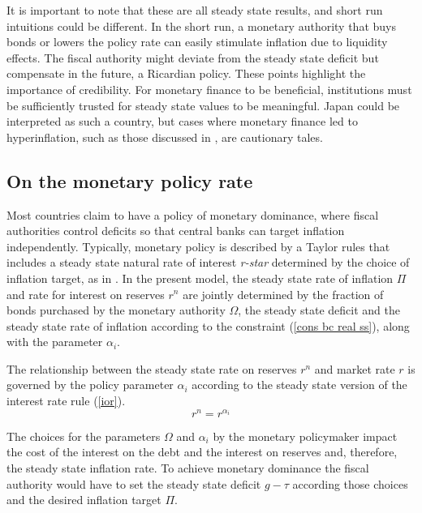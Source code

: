 \documentclass[]{article}
\begin{document}
It is important to note that these are all steady state results, and short run intuitions could be different. In the short run, a monetary authority that buys bonds or lowers the policy rate can easily stimulate inflation due to liquidity effects. The fiscal authority might deviate from the steady state deficit but compensate in the future, a Ricardian policy. These points highlight the importance of credibility. For monetary finance to be beneficial, institutions must be sufficiently trusted for steady state values to be meaningful. Japan could be interpreted as such a country, but cases where monetary finance led to hyperinflation, such as those discussed in \textcite{sargent1982ends}, are cautionary tales. 

\subsection{On the monetary policy rate}

 Most countries claim to have a policy of monetary dominance, where fiscal authorities control deficits so that central banks can target inflation independently. Typically, monetary policy is described by a Taylor rules that includes a steady state natural rate of interest \textit{r-star} determined by the choice of inflation target, as in \textcite{Platanov2024flexpricedeterminacy}. In the present model, the steady state rate of inflation $\Pi$ and rate for interest on reserves $r^{n}$ are jointly determined by the fraction of bonds purchased by the monetary authority $\Omega$, the steady state deficit and the steady state rate of inflation according to the constraint (\ref{cons bc real ss}), along with the parameter $\alpha_{i}$. 
 
 The relationship between the steady state rate on reserves $r^{n}$ and market rate $r$ is governed by the policy parameter $\alpha_{i}$ according to the steady state version of the interest rate rule (\ref{ior}).
\begin{equation}
  r^{n}=r^{\alpha_{i}} \label{ior ss}  
\end{equation}

The choices for the parameters $\Omega$ and $\alpha_{i}$ by the monetary policymaker impact the cost of the interest on the debt and the interest on reserves and, therefore, the steady state inflation rate. To achieve monetary dominance the fiscal authority would have to set the steady state deficit $g-\tau$ according those choices and the desired inflation target $\Pi$.
\end{document}

